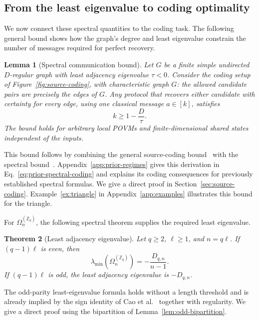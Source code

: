 \documentclass[11pt,a4paper]{article}
\numberwithin{equation}{section}
\numberwithin{figure}{section}
\numberwithin{table}{section}
\numberwithin{footnote}{section}
\newtheorem{theorem}{Theorem}[section]
\newtheorem{lemma}[theorem]{Lemma}
\theoremstyle{informal}\newtheorem*{informaltheorem}{Informal theorem}
\theoremstyle{definition}\newtheorem{example}{Example}[section]
\theoremstyle{remark}\newtheorem{remark}[theorem]{Remark}
\newcommand{\Z}{\mathbb Z}
\newcommand{\Om}{\Omega_n^{(\Z_q)}}
\begin{document}
\subsection{From the least eigenvalue to coding optimality}\label{sec:spectral-coding}
We now connect these spectral quantities to the coding task.
The following general bound shows how the graph's degree and least
eigenvalue constrain the number of messages required for perfect recovery.

\begin{lemma}[Spectral communication bound]\label{lem:source-hoffman}
Let \(G\) be a finite simple undirected \(D\)-regular graph with
least adjacency eigenvalue \(\tau<0\). Consider the coding setup
of Figure~\ref{fig:source-coding}, with characteristic graph \(G\):
the allowed candidate pairs are precisely the edges of \(G\).
Any protocol that recovers either
candidate with certainty for every edge, using one classical
message \(a\in[k]\), satisfies
\begin{equation}\label{eq:source-spectral-bound}
 k\geq1-\frac{D}{\tau}.
\end{equation}
The bound holds for arbitrary local POVMs and finite-dimensional
shared states independent of the inputs.
\end{lemma}

This bound follows by combining the general source-coding
bound~\cite[Theorem~2.1]{bblps} with the spectral
bound~\cite[Sec.~2.1]{bdov}.
Appendix~\ref{app:prior-regimes} gives this derivation in
Eq.~\eqref{eq:prior-spectral-coding} and explains its coding
consequences for previously established spectral formulas.
We give a direct proof in Section~\ref{sec:source-coding}.
Example~\ref{ex:triangle} in Appendix~\ref{app:examples}
illustrates this bound for the triangle.

For \(\Om\), the following spectral theorem supplies the required
least eigenvalue.

\begin{theorem}[Least adjacency eigenvalue]\label{thm:main}
Let \(q\geq2\), \(\ell\geq1\), and \(n=q\ell\).
If \((q-1)\ell\) is even, then
\begin{equation}
 \lambda_{\min}(\Om)=-\frac{D_{q,n}}{n-1}.
\end{equation}
If \((q-1)\ell\) is odd, the least adjacency eigenvalue is
\(-D_{q,n}\).
\end{theorem}

The odd-parity least-eigenvalue formula holds without a length
threshold and is already implied by the sign identity of
Cao et al.~\cite[Lemma~4.3]{cao} together with regularity.
We give a direct proof using the bipartition of Lemma~\ref{lem:odd-bipartition}.
\end{document}
